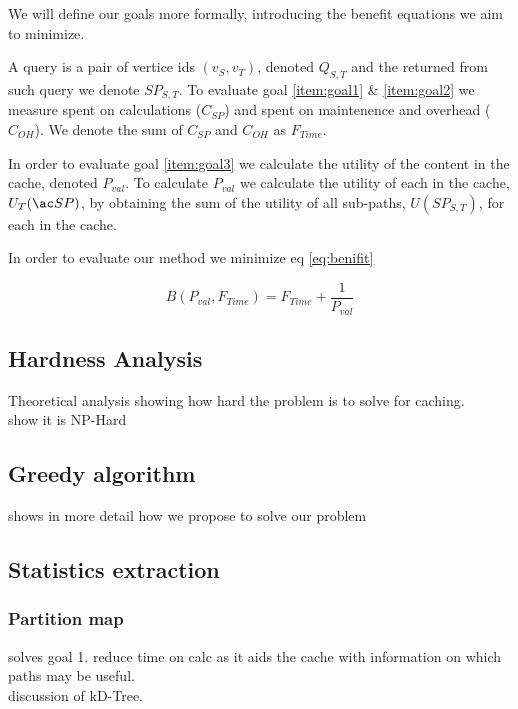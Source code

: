 We will define our goals more formally, introducing the benefit equations we aim to minimize.

A query is a pair of vertice ids $(v_S, v_T)$, denoted $Q_{S,T}$ and the \spath returned from such query we denote $SP_{S,T}$. 
To evaluate goal \ref{item:goal1} \& \ref{item:goal2} we measure \cet spent on \spath calculations ($C_{SP}$) and \cet spent on maintenence and overhead ($C_{OH}$). We denote the sum of $C_{SP}$ and $C_{OH}$ as $F_{Time}$.

In order to evaluate goal \ref{item:goal3} we calculate the utility of the content in the cache, denoted $P_{val}$. To calculate $P_{val}$ we calculate the utility of each \spath in the cache, $U_T(\spath)$, by obtaining the sum of the utility of all sub-paths, $U(SP_{S,T})$, for each \spath in the cache.

In order to evaluate our method we minimize eq \ref{eq:benifit}

\begin{equation}\label{eq:benifit}
B(P_{val},F_{Time}) = F_{Time} + \frac{1}{P_{val}}
\end{equation}



\subsection{Hardness Analysis}
Theoretical analysis showing how hard the problem is to solve for \spath caching.\\
show it is NP-Hard
 

\subsection{Greedy algorithm}
shows in more detail how we propose to solve our problem


\subsection{Statistics extraction}

\subsubsection{Partition map} 
solves goal 1. reduce time on \spath calc as it aids the cache with information on which paths may be useful.\\ 
discussion of kD-Tree.


